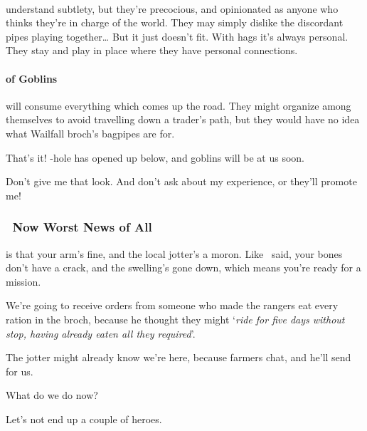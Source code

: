   \paragraph{}
  understand subtlety, but they're precocious, and opinionated as anyone who thinks they're in charge of the world.
  They may simply dislike the discordant pipes playing together\ldots
  But it just doesn't fit.
  With \glspl{hag} it's always personal.
  They stay and play in place where they have personal connections.
\fi%

\paragraph{ of Goblins}
will consume everything which comes up the road.
They might organize among themselves to avoid travelling down a trader's path, but they would have no idea what Wailfall \gls{broch}'s bagpipes are for.

That's it!
-hole has opened up below, and goblins will be at us soon.

Don't give me that look.
And don't ask about my experience, or they'll promote me!

\subsubsection*{~Now Worst News of All}
is that your arm's fine, and the local \gls{jotter}'s a moron.
Like \currentName\ said, your bones don't have a crack, and the swelling's gone down, which means you're ready for a mission.

We're going to receive orders from someone who made the \glspl{ranger} eat every \gls{ration} in the \gls{broch}, because he thought they might `\textit{ride for five days without stop, having already eaten all they required}'.

The \gls{jotter} might already know we're here, because farmers chat, and he'll send for us.

What do we do now?

Let's not end up a couple of heroes.
